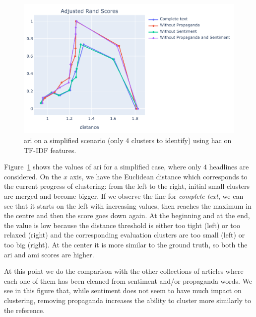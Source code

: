 \begin{figure}[!htbp]
    \centering
    \includegraphics[width=\linewidth]{figures/sentpropnoise_4_en_tfidf_fitness_topic-cropped.pdf}
    \caption{\acrshort{ari} on a simplified scenario (only 4 clusters to identify) using \acrshort{hac} on TF-IDF features.}
    \label{fig:hierarchical_sentpropnoise_evolution}
\end{figure}

Figure~\ref{fig:hierarchical_sentpropnoise_evolution} shows the values of \acrshort{ari} for a simplified case, where only $4$ headlines are considered.
On the $x$ axis, we have the Euclidean distance which corresponds to the current progress of clustering: from the left to the right, initial small clusters are merged and become bigger.
If we observe the line for \textit{complete text}, we can see that it starts on the left with increasing values, then reaches the maximum in the centre and then the score goes down again. At the beginning and at the end, the value is low because the distance threshold is either too tight (left) or too relaxed (right) and the corresponding evaluation clusters are too small (left) or too big (right).
At the center it is more similar to the ground truth, so both the \acrshort{ari} and \acrshort{ami}
scores are higher.

At this point we do the comparison with the other collections of articles where each one of them has been cleaned from sentiment and/or propaganda words. We see in this figure that, while sentiment does not seem to have much impact on clustering, removing propaganda increases the ability to cluster more similarly to the reference. 

